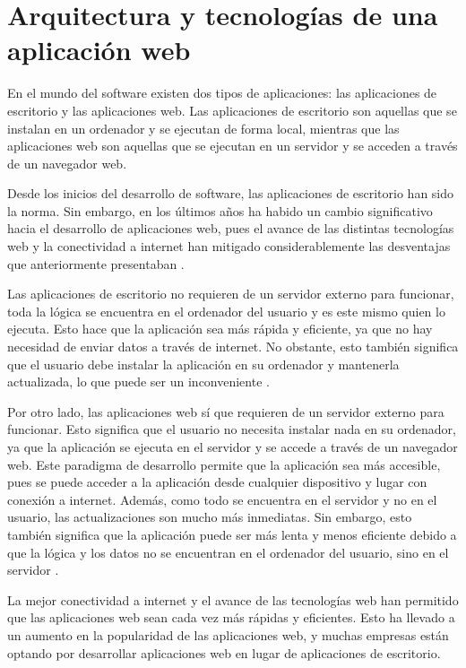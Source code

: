 \section{Arquitectura y tecnologías de una aplicación web}
\label{sec:arquitectura_sistema}

En el mundo del software existen dos tipos de aplicaciones: las aplicaciones de escritorio y las aplicaciones web. Las aplicaciones de escritorio son aquellas que se instalan en un ordenador y se ejecutan de forma local, mientras que las aplicaciones web son aquellas que se ejecutan en un servidor y se acceden a través de un navegador web.

Desde los inicios del desarrollo de software, las aplicaciones de escritorio han sido la norma. Sin embargo, en los últimos años ha habido un cambio significativo hacia el desarrollo de aplicaciones web, pues el avance de las distintas tecnologías web y la conectividad a internet han mitigado considerablemente las desventajas que anteriormente presentaban \cite{evo_web}.

Las aplicaciones de escritorio no requieren de un servidor externo para funcionar, toda la lógica se encuentra en el ordenador del usuario y es este mismo quien lo ejecuta. Esto hace que la aplicación sea más rápida y eficiente, ya que no hay necesidad de enviar datos a través de internet. No obstante, esto también significa que el usuario debe instalar la aplicación en su ordenador y mantenerla actualizada, lo que puede ser un inconveniente \cite{web_vs_desktop}.

Por otro lado, las aplicaciones web sí que requieren de un servidor externo para funcionar. Esto significa que el usuario no necesita instalar nada en su ordenador, ya que la aplicación se ejecuta en el servidor y se accede a través de un navegador web. Este paradigma de desarrollo permite que la aplicación sea más accesible, pues se puede acceder a la aplicación desde cualquier dispositivo y lugar con conexión a internet. Además, como todo se encuentra en el servidor y no en el usuario, las actualizaciones son mucho más inmediatas. Sin embargo, esto también significa que la aplicación puede ser más lenta y menos eficiente debido a que la lógica y los datos no se encuentran en el ordenador del usuario, sino en el servidor \cite{web_vs_desktop}.

La mejor conectividad a internet y el avance de las tecnologías web han permitido que las aplicaciones web sean cada vez más rápidas y eficientes. Esto ha llevado a un aumento en la popularidad de las aplicaciones web, y muchas empresas están optando por desarrollar aplicaciones web en lugar de aplicaciones de escritorio.

